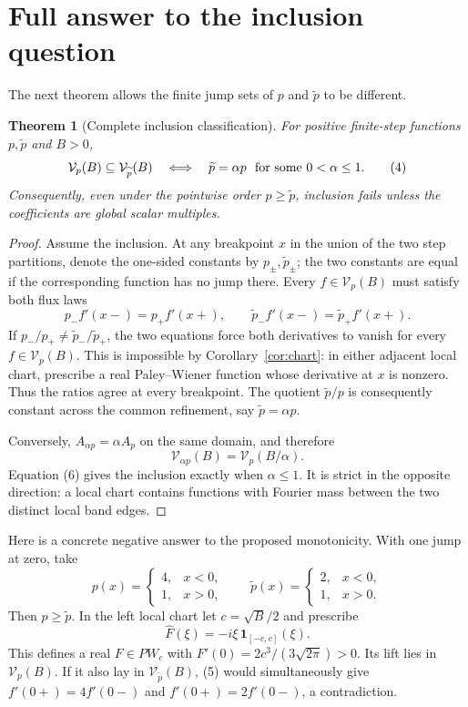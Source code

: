 \documentclass[11pt]{article}
\newtheorem{theorem}{Theorem}
\newcommand{\V}{\mathcal V}
\begin{document}
\section*{Full answer to the inclusion question}

The next theorem allows the finite jump sets of $p$ and $\widetilde p$ to be
different.

\begin{theorem}[Complete inclusion classification]\label{thm:inclusion}
For positive finite-step functions $p,\widetilde p$ and $B>0$,
\[
 \V_p(B)\subseteq\V_{\widetilde p}(B)
 \quad\Longleftrightarrow\quad
 \widetilde p=\alpha p\ \hbox{ for some }0<\alpha\le1.              \tag{4}
\]
Consequently, even under the pointwise order $p\ge\widetilde p$, inclusion
fails unless the coefficients are global scalar multiples.
\end{theorem}

\begin{proof}
Assume the inclusion.  At any breakpoint $x$ in the union of the two step
partitions, denote the one-sided constants by $p_\pm,\widetilde p_\pm$;
the two constants are equal if the corresponding function has no jump there.
Every $f\in\V_p(B)$ must satisfy both flux laws
\[
 p_-f'(x-)=p_+f'(x+),\qquad
 \widetilde p_-f'(x-)=\widetilde p_+f'(x+).            \tag{5}
\]
If $p_-/p_+\ne\widetilde p_-/\widetilde p_+$, the two equations force both
derivatives to vanish for every $f\in\V_p(B)$.  This is impossible by
Corollary~\ref{cor:chart}: in either adjacent local chart, prescribe a real
Paley--Wiener function whose derivative at $x$ is nonzero.  Thus the ratios
agree at every breakpoint.  The quotient $\widetilde p/p$ is consequently
constant across the common refinement, say $\widetilde p=\alpha p$.

Conversely, $A_{\alpha p}=\alpha A_p$ on the same domain, and therefore
\[
                      \V_{\alpha p}(B)=\V_p(B/\alpha). \tag{6}
\]
Equation (6) gives the inclusion exactly when $\alpha\le1$.  It is strict in
the opposite direction: a local chart contains functions with Fourier mass
between the two distinct local band edges.
\end{proof}

Here is a concrete negative answer to the proposed monotonicity.  With one
jump at zero, take
\[
 p(x)=\begin{cases}4,&x<0,\\1,&x>0,\end{cases}\qquad
 \widetilde p(x)=\begin{cases}2,&x<0,\\1,&x>0.\end{cases}            \tag{7}
\]
Then $p\ge\widetilde p$.  In the left local chart let
$c=\sqrt B/2$ and prescribe
\[
             \widehat F(\xi)=-i\xi\,\mathbf1_{[-c,c]}(\xi).
\]
This defines a real $F\in PW_c$ with
$F'(0)=2c^3/(3\sqrt{2\pi})>0$.  Its lift lies in $\V_p(B)$.  If it also lay
in $\V_{\widetilde p}(B)$, (5) would simultaneously give
$f'(0+)=4f'(0-)$ and $f'(0+)=2f'(0-)$, a contradiction.
\end{document}
